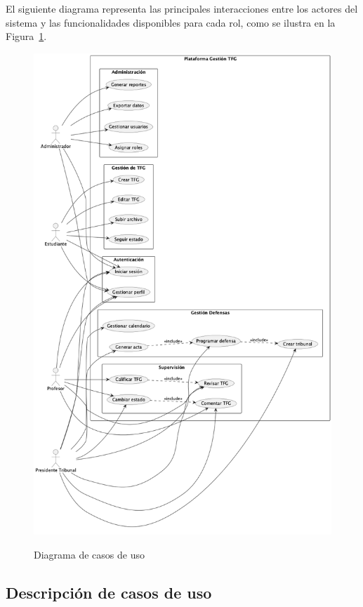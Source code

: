 \documentclass[12pt,a4paper,oneside]{report}
\providecommand{\pandocbounded}[1]{#1}
\begin{document}
El siguiente diagrama representa las principales interacciones entre los
actores del sistema y las funcionalidades disponibles para cada rol, como se ilustra en la Figura~\ref{fig:diagrama-casos-uso}.

\begin{figure}[H]
\centering
\pandocbounded{\includegraphics[keepaspectratio,alt={Diagrama de casos de uso}]{processed/images/04_analisis_sistema_plantuml_0.png}}
\caption{Diagrama de casos de uso}
\label{fig:diagrama-casos-uso}
\end{figure}

\subsection{Descripción de casos de
uso}\label{descripciuxf3n-de-casos-de-uso}
\end{document}
